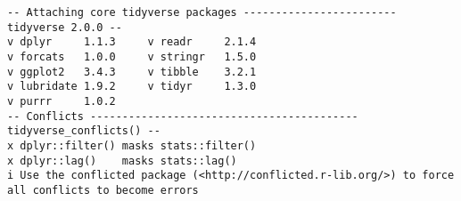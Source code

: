 \documentclass[
  letterpaper,
  DIV=11,
  numbers=noendperiod]{scrartcl}
\newenvironment{Shaded}{\begin{snugshade}}{\end{snugshade}}
\newcommand{\AttributeTok}[1]{\textcolor[rgb]{0.40,0.45,0.13}{#1}}
\newcommand{\ControlFlowTok}[1]{\textcolor[rgb]{0.00,0.23,0.31}{#1}}
\newcommand{\DecValTok}[1]{\textcolor[rgb]{0.68,0.00,0.00}{#1}}
\newcommand{\FunctionTok}[1]{\textcolor[rgb]{0.28,0.35,0.67}{#1}}
\newcommand{\NormalTok}[1]{\textcolor[rgb]{0.00,0.23,0.31}{#1}}
\newcommand{\OtherTok}[1]{\textcolor[rgb]{0.00,0.23,0.31}{#1}}
\newcommand{\SpecialCharTok}[1]{\textcolor[rgb]{0.37,0.37,0.37}{#1}}
\newcommand{\StringTok}[1]{\textcolor[rgb]{0.13,0.47,0.30}{#1}}
\begin{document}
\begin{verbatim}
-- Attaching core tidyverse packages ------------------------ tidyverse 2.0.0 --
v dplyr     1.1.3     v readr     2.1.4
v forcats   1.0.0     v stringr   1.5.0
v ggplot2   3.4.3     v tibble    3.2.1
v lubridate 1.9.2     v tidyr     1.3.0
v purrr     1.0.2     
-- Conflicts ------------------------------------------ tidyverse_conflicts() --
x dplyr::filter() masks stats::filter()
x dplyr::lag()    masks stats::lag()
i Use the conflicted package (<http://conflicted.r-lib.org/>) to force all conflicts to become errors
\end{verbatim}

\begin{Shaded}
\end{Shaded}
\end{document}
